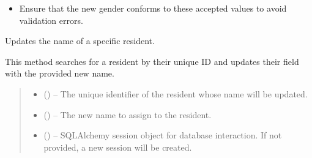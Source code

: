 \documentclass[letterpaper,10pt,english]{sphinxmanual}
\begin{document}
\begin{fulllineitems}
\begin{fulllineitems}
\begin{itemize}
\item {} 
\sphinxAtStartPar
Ensure that the new gender conforms to these accepted values to avoid validation errors.

\end{itemize}

\end{fulllineitems}


\begin{fulllineitems}
\label{\detokenize{app.controllers:app.controllers.resident_controller.ResidentController.updateResidentName}}
\pysigstartsignatures
\pysiglinewithargsret
{}
{\sphinxparamcomma {}\sphinxparamcomma {}}
{}
\pysigstopsignatures
\sphinxAtStartPar
Updates the name of a specific resident.

\sphinxAtStartPar
This method searches for a resident by their unique ID and updates their  field
with the provided new name.
\begin{quote}\begin{description}
\begin{itemize}
\item {} 
\sphinxAtStartPar
{} () – The unique identifier of the resident whose name will be updated.

\item {} 
\sphinxAtStartPar
{} () – The new name to assign to the resident.

\item {} 
\sphinxAtStartPar
{} (\sphinxstyleliteralemphasis{\sphinxupquote{, }}) – SQLAlchemy session object for database interaction.
If not provided, a new session will be created.


\end{itemize}
\end{description}
\end{quote}
\end{fulllineitems}
\end{fulllineitems}
\end{document}
